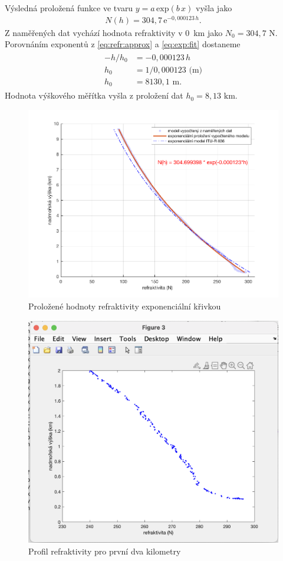 \documentclass[twoside]{ctuthesis}
\newcommand{\mt}[1]{\text{#1}}
\theoremstyle{plain}
\theoremstyle{definition}
\theoremstyle{note}
\begin{document}
	Výsledná proložená funkce ve tvaru $y=a\,\mt{exp}(b\,x)$ vyšla jako
	\begin{align}
		N(h) = 304{,}7\,\mt{e}^{-0{,}000123\,h}.
		\label{eq:exp:fit}
	\end{align}
	Z naměřených dat vychází hodnota refraktivity v 0~km jako $N_\mt{0} = 304{,}7 \mt{ N}$. Porovnáním exponentů z \eqref{eq:refr:approx} a \eqref{eq:exp:fit} dostaneme
	\begin{align}
		\begin{split}
		-h/h_\mt{0} &= -0{,}000123\,h\\
		h_\mt{0} &= 1/0{,}000123 \mt{ (m)}\\
		h_\mt{0} &= 8130{,}1 \mt{ m}.
		\end{split}
	\end{align}
	Hodnota výškového měřítka vyšla z proložení dat $h_\mt{0} = 8{,}13 \mt{ km}$.
	\begin{figure}[hbtp]
		\centering
		\includegraphics[width=.7\textwidth]{Graphs/refractivity_meas_fit_model.pdf}
		\caption{Proložené hodnoty refraktivity exponenciální křivkou}
		\label{graph:refr:fit}
	\end{figure}

	\begin{figure}
		\centering
		\includegraphics[width=.7\textwidth]{Graphs/ref2km.png}
		\caption{Profil refraktivity pro první dva kilometry}
		\label{graf:refr:2km}
	\end{figure}
\end{document}
